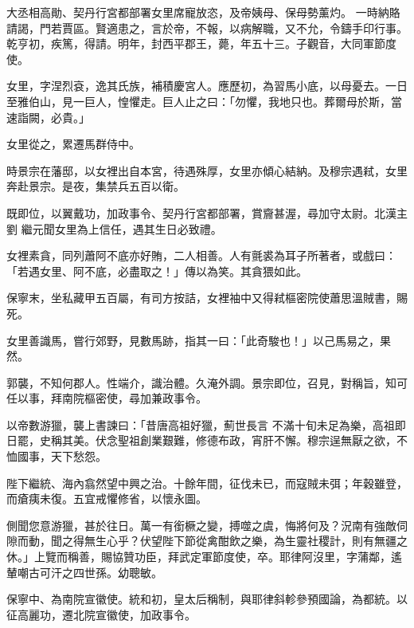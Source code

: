 \begin{pinyinscope}
 大丞相高勛、契丹行宮都部署女里席寵放恣，及帝姨母、保母勢薰灼。
 一時納賂請謁，門若賈區。賢適患之，言於帝，不報，以病解職，又不允，令鑄手印行事。乾亨初，疾篤，得請。明年，封西平郡王，薨，年五十三。子觀音，大同軍節度使。



 女里，字涅烈袞，逸其氏族，補積慶宮人。應歷初，為習馬小底，以母憂去。一日至雅伯山，見一巨人，惶懼走。巨人止之曰：「勿懼，我地只也。葬爾母於斯，當速詣闕，必貴。」



 女里從之，累遷馬群侍中。



 時景宗在藩邸，以女裡出自本宮，待遇殊厚，女里亦傾心結納。及穆宗遇弒，女里奔赴景宗。是夜，集禁兵五百以衛。



 既即位，以翼戴功，加政事令、契丹行宮都部署，賞齎甚渥，尋加守太尉。北漢主劉
 繼元聞女里為上信任，遇其生日必致禮。



 女裡素貪，同列蕭阿不底亦好賄，二人相善。人有氈裘為耳子所著者，或戲曰：「若遇女里、阿不底，必盡取之！」傳以為笑。其貪猥如此。



 保寧末，坐私藏甲五百屬，有司方按詰，女裡袖中又得弒樞密院使蕭思溫賊書，賜死。



 女里善識馬，嘗行郊野，見數馬跡，指其一曰：「此奇駿也！」以己馬易之，果然。



 郭襲，不知何郡人。性端介，識治體。久淹外調。景宗即位，召見，對稱旨，知可任以事，拜南院樞密使，尋加兼政事令。



 以帝數游獵，襲上書諫曰：「昔唐高祖好獵，薊世長言
 不滿十旬未足為樂，高祖即日罷，史稱其美。伏念聖祖創業艱難，修德布政，宵肝不懈。穆宗逞無厭之欲，不恤國事，天下愁怨。



 陛下繼統、海內翕然望中興之治。十餘年間，征伐未已，而寇賊未弭；年穀雖登，而瘡痍未復。五宜戒懼修省，以懷永圖。



 側聞您意游獵，甚於往日。萬一有銜橛之變，搏噬之虞，悔將何及？況南有強敵伺隙而動，聞之得無生心乎？伏望陛下節從禽酣飲之樂，為生靈社稷計，則有無疆之休。」上覽而稱善，賜協贊功臣，拜武定軍節度使，卒。耶律阿沒里，字蒲鄰，遙輦嘲古可汗之四世孫。幼聰敏。



 保寧中、為南院宣徽使。統和初，皇太后稱制，與耶律斜軫參預國論，為都統。以征高麗功，遷北院宣徽使，加政事令。




\end{pinyinscope}
